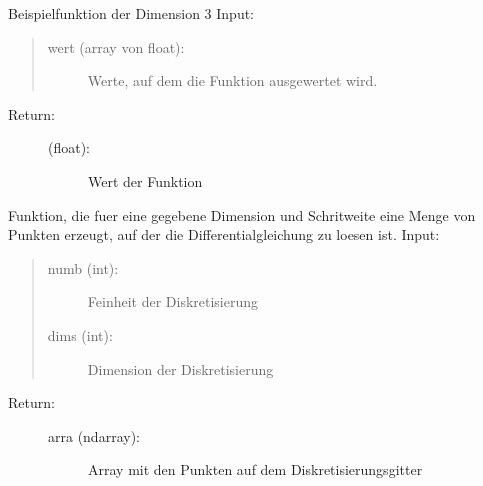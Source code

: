 \documentclass[letterpaper,10pt,ngerman]{sphinxmanual}
\begin{document}

\begin{fulllineitems}
\label{\detokenize{index:aufg_5_2.fntn3}}
Beispielfunktion der Dimension 3
Input:
\begin{quote}
\begin{description}
\item[{wert (array von float):}] \leavevmode
Werte, auf dem die Funktion ausgewertet wird.

\end{description}
\end{quote}
\begin{description}
\item[{Return:}] \leavevmode\begin{description}
\item[{(float):}] \leavevmode
Wert der Funktion

\end{description}

\end{description}

\end{fulllineitems}


\begin{fulllineitems}
\label{\detokenize{index:aufg_5_2.gitter}}
Funktion, die fuer eine gegebene Dimension und Schritweite eine Menge von Punkten erzeugt, auf
der die Differentialgleichung zu loesen ist.
Input:
\begin{quote}
\begin{description}
\item[{numb (int):}] \leavevmode
Feinheit der Diskretisierung

\item[{dims (int):}] \leavevmode
Dimension der Diskretisierung

\end{description}
\end{quote}
\begin{description}
\item[{Return:}] \leavevmode\begin{description}
\item[{arra (ndarray):}] \leavevmode
Array mit den Punkten auf dem Diskretisierungsgitter

\end{description}

\end{description}

\end{fulllineitems}
\end{document}
